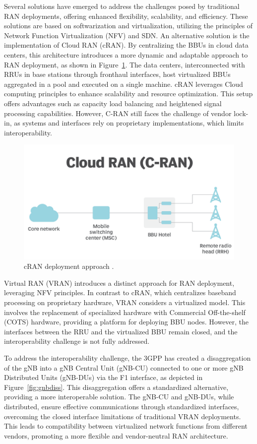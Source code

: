 Several solutions have emerged to address the challenges posed by traditional RAN deployments, offering enhanced flexibility, scalability, and efficiency.
These solutions are based on softwarization and virtualization, utilizing the principles of Network Function Virtualization (NFV) and SDN. An alternative solution is the implementation of Cloud RAN (cRAN). By centralizing the BBUs in cloud data centers, this architecture introduces a more dynamic and adaptable approach to RAN deployment, as shown in Figure~\ref{fig:cRAN}.
The data centers, interconnected with RRUs in base stations through fronthaul interfaces, host virtualized BBUs aggregated in a pool and executed on a single machine.
cRAN leverages Cloud computing principles to enhance scalability and resource optimization.
This setup offers advantages such as capacity load balancing and heightened signal processing capabilities.
However, C-RAN still faces the challenge of vendor lock-in, as systems and interfaces rely on proprietary implementations, which limits interoperability.

\begin{figure}[H]
    \centering
    \includegraphics[width=0.5\linewidth]{figures/cRAN}
    \caption[cRAN deployment approach]{cRAN deployment approach \cite{cRAN}.}
    \label{fig:cRAN}
\end{figure}

Virtual RAN (VRAN) introduces a distinct approach for RAN deployment, leveraging NFV principles.
In contrast to cRAN, which centralizes baseband processing on proprietary hardware, VRAN considers a virtualized model.
This involves the replacement of specialized hardware with Commercial Off-the-shelf (COTS) hardware, providing a platform for deploying BBU nodes.
However, the interfaces between the RRU and the virtualized BBU remain closed, and the interoperability challenge is not fully addressed.


To address the interoperability challenge, the 3GPP has created a disaggregation of the gNB into a gNB Central Unit (gNB-CU) connected to one or more gNB Distributed Units (gNB-DUs) via the F1 interface, as depicted in Figure~\ref{fig:gnbdiss}.
This disaggregation offers a standardized alternative, providing a more interoperable solution.
The gNB-CU and gNB-DUs, while distributed, ensure effective communications through standardized interfaces, overcoming the closed interface limitations of traditional VRAN deployments.
This leads to compatibility between virtualized network functions from different vendors, promoting a more flexible and vendor-neutral RAN architecture.

